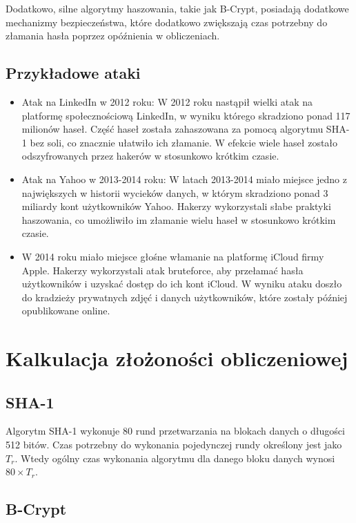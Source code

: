 \documentclass{article}
\begin{document}
    Dodatkowo, silne algorytmy haszowania, takie jak B-Crypt, posiadają dodatkowe mechanizmy bezpieczeństwa, które dodatkowo zwiększają czas potrzebny do złamania hasła poprzez opóźnienia w obliczeniach. 

\subsection*{Przykładowe ataki}
    \begin{itemize}
        \item Atak na LinkedIn w 2012 roku: W 2012 roku nastąpił wielki atak na platformę społecznościową LinkedIn, w wyniku którego skradziono ponad 117 milionów haseł. Część haseł została zahaszowana za pomocą algorytmu SHA-1 bez soli, co znacznie ułatwiło ich złamanie. W efekcie wiele haseł zostało odszyfrowanych przez hakerów w stosunkowo krótkim czasie.
        \item Atak na Yahoo w 2013-2014 roku: W latach 2013-2014 miało miejsce jedno z największych w historii wycieków danych, w którym skradziono ponad 3 miliardy kont użytkowników Yahoo. Hakerzy wykorzystali słabe praktyki haszowania, co umożliwiło im złamanie wielu haseł w stosunkowo krótkim czasie.
        \item W 2014 roku miało miejsce głośne włamanie na platformę iCloud firmy Apple. Hakerzy wykorzystali atak bruteforce, aby przełamać hasła użytkowników i uzyskać dostęp do ich kont iCloud. W wyniku ataku doszło do kradzieży prywatnych zdjęć i danych użytkowników, które zostały później opublikowane online.
    \end{itemize}

\section{Kalkulacja złożoności obliczeniowej}
    
\subsection{SHA-1}
    
    Algorytm SHA-1 wykonuje 80 rund przetwarzania na blokach danych o długości 512 bitów. Czas potrzebny do wykonania pojedynczej rundy określony jest jako \( T_r \). Wtedy ogólny czas wykonania algorytmu dla danego bloku danych wynosi \( 80 \times T_r \).
        
\subsection{B-Crypt}
    
\end{document}
